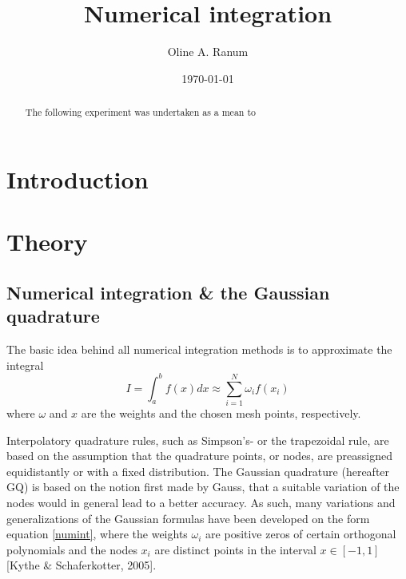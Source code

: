 \documentclass[%
reprint,
amsmath,amssymb,
aps,
]{revtex4-1}
\begin{document}
\title{Numerical integration}
\author{Oline A. Ranum}
\date{\today}


\begin{abstract}
	The following experiment was undertaken as a mean to 
\end{abstract}
\maketitle

\section{Introduction}


\section{Theory}



\subsection{Numerical integration \& the Gaussian quadrature} \noindent 
The basic idea behind all numerical integration methods is to approximate the integral 
\begin{equation}\label{numint}
	I = \int_{a}^{b}f(x)dx \approx \sum_{i=1}^{N} \omega_if(x_i)
\end{equation}
where $\omega$ and $x$ are the weights and the chosen mesh points, respectively.

Interpolatory quadrature rules, such as Simpson's- or the trapezoidal rule, are based on the assumption that the quadrature points, or nodes, are preassigned equidistantly or with a fixed distribution. The Gaussian quadrature (hereafter GQ) is based on the notion first made by Gauss, that a suitable variation of the nodes would in general lead to a better accuracy. As such, many variations and generalizations of the Gaussian formulas have been developed on the form equation \ref{numint}, where the weights $\omega_i$ are positive zeros of certain orthogonal polynomials and the nodes $x_i$ are distinct points in the interval $x\in[-1,1]$ [Kythe \& Schaferkotter, 2005]. 
\end{document}
